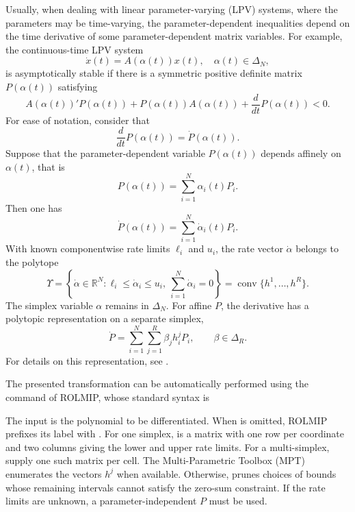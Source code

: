 \documentclass[english,11pt]{article}
\theoremstyle{break} \theorembodyfont{\small\rm}
\begin{document}
Usually, when dealing with linear parameter-varying (LPV) systems, where the parameters
may be time-varying, the parameter-dependent inequalities depend on the time derivative of
some parameter-dependent matrix variables. For example, the continuous-time LPV system
\[
 \dot{x}(t) = A(\alpha(t))x(t), \quad \alpha(t) \in \Delta_N,
\]
is asymptotically stable if there is a symmetric positive definite matrix $P(\alpha(t))$
satisfying
\[
 A(\alpha(t))'P(\alpha(t)) + P(\alpha(t))A(\alpha(t)) + \frac{d}{d t} P(\alpha(t)) < 0.
\]
For ease of notation, consider that
\[
 \frac{d}{d t} P(\alpha(t)) = \dot{P}(\alpha(t)).
\]
Suppose that the parameter-dependent variable $P(\alpha(t))$ depends affinely on $\alpha(t)$, that is
\[
 P(\alpha(t)) = \sum_{i = 1}^N \alpha_i(t)P_i.
\]
Then one has
\[
 \dot{P}(\alpha(t)) = \sum_{i = 1}^N \dot{\alpha}_i(t)P_i.
\]
With known componentwise rate limits $\ell_i$ and $u_i$, the rate vector
$\dot\alpha$ belongs to the polytope
\[
\Upsilon=\left\{\dot\alpha\in\mathbb R^N:
       \ell_i\leq\dot\alpha_i\leq u_i,\
       \sum_{i=1}^N\dot\alpha_i=0\right\}
       =\operatorname{conv}\{h^1,\ldots,h^R\}.
\]
The simplex variable $\alpha$ remains in $\Delta_N$. For affine $P$,
the derivative has a polytopic representation on a separate simplex,
\[
 \dot P=\sum_{i=1}^N\sum_{j=1}^R \beta_j h_i^j P_i,\qquad
 \beta\in\Delta_R.
\]
For details on this representation, see \cite{CGTV:07,GC:06a}.

The presented transformation can be automatically performed using the command  of
ROLMIP, whose standard syntax is


\vspace{0.5cm}%
\noindent\begin{minipage}{\linewidth}
\end{minipage}
\vspace{0.2cm}

The input  is the polynomial to be differentiated.
When  is omitted, ROLMIP prefixes its label with
\mcode{dot\_}.
For one simplex,  is a matrix with one row per coordinate
and two columns giving the lower and upper rate limits. For a
multi-simplex, supply one such matrix per cell. The Multi-Parametric
Toolbox (MPT)~\cite{HKJM:13} enumerates the vectors $h^j$ when available.
Otherwise, \mcode{diff} prunes choices of bounds whose remaining intervals
cannot satisfy the zero-sum constraint. If the rate limits are unknown,
a parameter-independent $P$ must be used.
\end{document}
